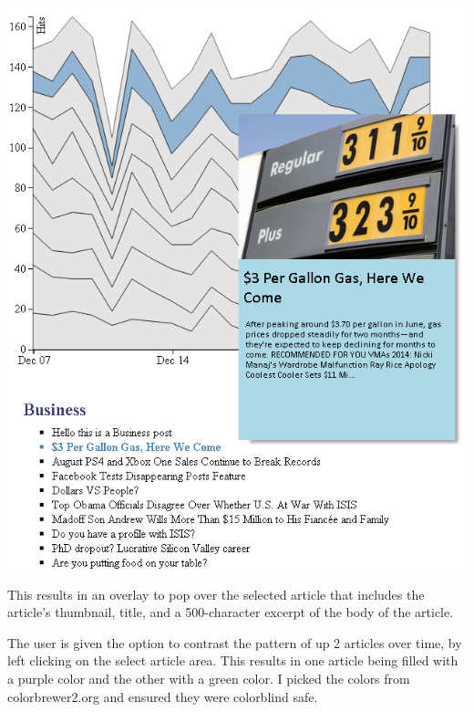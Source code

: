 \documentclass[12pt]{article}
\begin{document}
\noindent\includegraphics[scale=0.9]{img/viz_2}

This results in an overlay to pop over the selected article that includes the article's thumbnail, title, and a 500-character excerpt of the body of the article. 

The user is given the option to contrast the pattern of up 2 articles over time, by left clicking on the select article area. This results in one article being filled with a purple color and the other with a green color. I picked the colors from colorbrewer2.org and ensured they were colorblind safe.
\end{document}
